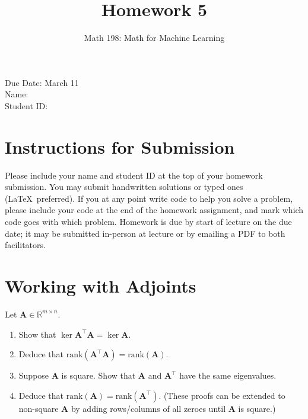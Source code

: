 \documentclass{article}
\title{Homework 5}
\author{Math 198: Math for Machine Learning}
\date{}
\begin{document}
\maketitle

\noindent
Due Date: March 11 \\
Name: \\
Student ID:

\section*{Instructions for Submission}
Please include your name and student ID at the top of your homework submission. You may submit handwritten solutions or typed ones (\LaTeX\ preferred). If you at any point write code to help you solve a problem, please include your code at the end of the homework assignment, and mark which code goes with which problem. Homework is due by start of lecture on the due date; it may be submitted in-person at lecture or by emailing a PDF to both facilitators.

\section{Working with Adjoints}
Let $\textbf{A} \in \mathbb{R}^{m \times n}$.
\begin{enumerate}[label=(\alph*)]
\item Show that $\ker \textbf{A}^\top \textbf{A} = \ker \textbf{A}$.
\item Deduce that $\text{rank}( \textbf{A}^\top \textbf{A}) = \text{rank}(\textbf{A})$.
\item Suppose $\mathbf{A}$ is square. Show that $\textbf{A}$ and $\textbf{A}^\top$ have the same eigenvalues.
\item Deduce that $\text{rank}(\textbf{A}) = \text{rank}(\textbf{A}^\top)$. (These proofs can be extended to non-square $\mathbf{A}$ by adding rows/columns of all zeroes until $\mathbf{A}$ is square.)
\end{enumerate}
\end{document}
